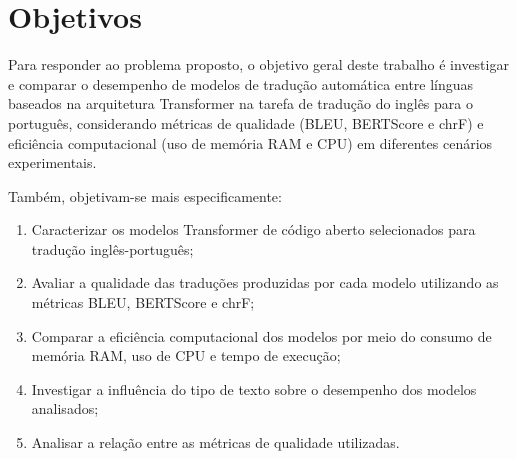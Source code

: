 \section{Objetivos}

Para responder ao problema proposto, o objetivo geral deste trabalho é investigar e comparar o desempenho de modelos de tradução automática entre línguas baseados na arquitetura Transformer na tarefa de tradução do inglês para o português, considerando métricas de qualidade (BLEU, BERTScore e chrF) e eficiência computacional (uso de memória RAM e CPU) em diferentes cenários experimentais.

Também, objetivam-se mais especificamente:

\begin{enumerate}	
    \item Caracterizar os modelos Transformer de código aberto selecionados para tradução inglês-português;
    
    \item Avaliar a qualidade das traduções produzidas por cada modelo utilizando as métricas BLEU, BERTScore e chrF;
    
    \item Comparar a eficiência computacional dos modelos por meio do consumo de memória RAM, uso de CPU e tempo de execução;
    
    \item Investigar a influência do tipo de texto sobre o desempenho dos modelos analisados;

    \item Analisar a relação entre as métricas de qualidade utilizadas.

\end{enumerate}



